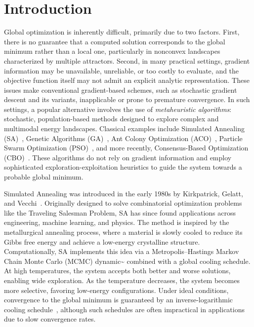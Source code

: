 \documentclass[10pt,a4paper]{article}
\theoremstyle{theorem}
\numberwithin{equation}{section}
\begin{document}
\section{Introduction}
Global optimization is inherently difficult, primarily due to two factors.
First, there is no guarantee that a computed solution corresponds to the global minimum rather than a local one, particularly in nonconvex landscapes characterized by multiple attractors.
Second, in many practical settings, gradient information may be unavailable, unreliable, or too costly to evaluate, and the objective function itself may not admit an explicit analytic representation.
These issues make conventional gradient-based schemes, such as stochastic gradient descent and its variants, inapplicable or prone to premature convergence.
In such settings, a popular alternative involves the use of \textit{metaheuristic algorithms}: stochastic, population-based methods designed to explore complex and multimodal energy landscapes. Classical examples include Simulated Annealing (SA)~\cite{kirkpatrick_optimization_1983}, Genetic Algorithms (GA)~\cite{holland_adaptation_1992,goldberg_genetic_1989}, Ant Colony Optimization (ACO)~\cite{dorigo_ant_1996}, Particle Swarm Optimization (PSO)~\cite{kennedy_particle_1995}, and more recently, Consensus-Based Optimization (CBO)~\cite{carrillo_analytical_2018, pinnau_consensus-based_2017}. 
These algorithms do not rely on gradient information and employ sophisticated exploration-exploitation heuristics to guide the system towards a probable global minimum. 

Simulated Annealing was introduced in the early 1980s by Kirkpatrick, Gelatt, and Vecchi~\cite{kirkpatrick_optimization_1983}. Originally designed to solve combinatorial optimization problems like the Traveling Salesman Problem, SA has since found applications across engineering, machine learning, and physics\cite{gendreau_simulated_2019,rere_simulated_2015}. The method is inspired by the metallurgical annealing process, where a material is slowly cooled to reduce its Gibbs free energy and achieve a low-energy crystalline structure. Computationally, SA implements this idea via a Metropolis--Hastings Markov Chain Monte Carlo (MCMC) dynamic^^>\cite{hastings_monte_1970,metropolis_equation_1953} combined with a global cooling schedule. At high temperatures, the system accepts both better and worse solutions, enabling wide exploration. As the temperature decreases, the system becomes more selective, favoring low-energy configurations. Under ideal conditions, convergence to the global minimum is guaranteed by an inverse-logarithmic cooling schedule~\cite{hajek_cooling_1988}, although such schedules are often impractical in applications due to slow convergence rates.
\end{document}
